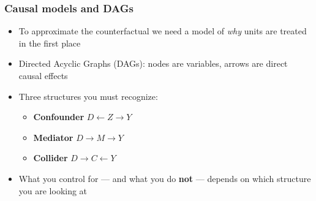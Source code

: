 \begin{frame}
\frametitle{Causal models and DAGs}
\centering

\begin{itemize}[<+->]
\item To approximate the counterfactual we need a model of \textit{why} units are treated in the first place
\vspace{6pt}
\item Directed Acyclic Graphs (DAGs): nodes are variables, arrows are direct causal effects
\vspace{6pt}
\item Three structures you must recognize:
  \begin{itemize}
  \item \textbf{Confounder} \quad $D \leftarrow Z \rightarrow Y$
  \item \textbf{Mediator} \quad $D \rightarrow M \rightarrow Y$
  \item \textbf{Collider} \quad $D \rightarrow C \leftarrow Y$
  \end{itemize}
\vspace{6pt}
\item What you control for --- and what you do \textbf{not} --- depends on which structure you are looking at
\end{itemize}

\end{frame}

